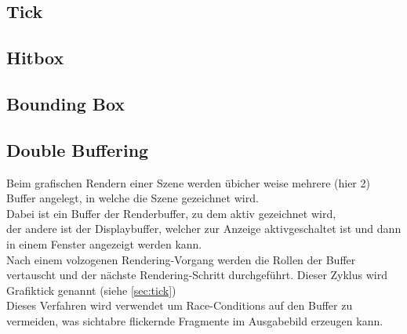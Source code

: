 \subsection{Tick}

\subsection{Hitbox}

\subsection{Bounding Box}

\subsection{Double Buffering}
\label{sec:doublebuffer}
Beim grafischen Rendern einer Szene werden übicher weise mehrere (hier 2) Buffer angelegt, in welche die Szene gezeichnet wird.\\
Dabei ist ein Buffer der Renderbuffer, zu dem aktiv gezeichnet wird,\\
der andere ist der Displaybuffer, welcher zur Anzeige aktivgeschaltet ist und dann in einem Fenster angezeigt werden kann.\\
Nach einem volzogenen Rendering-Vorgang werden die Rollen der Buffer vertauscht und der nächste Rendering-Schritt durchgeführt. Dieser Zyklus wird Grafiktick genannt (siehe \ref{sec:tick})\\
Dieses Verfahren wird verwendet um Race-Conditions auf den Buffer zu vermeiden, was sichtabre flickernde Fragmente im Ausgabebild erzeugen kann.
